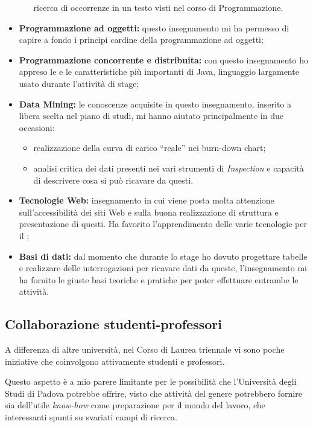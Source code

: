 \begin{itemize}
\begin{itemize}
    ricerca di occorrenze in un testo visti nel corso di Programmazione.
  \end{itemize}
\item \textbf{Programmazione ad oggetti:} questo insegnamento mi ha permesso
  di capire a fondo i principi cardine della programmazione ad oggetti;
\item \textbf{Programmazione concorrente e distribuita:} con questo
  insegnamento ho appreso le  e le caratteristiche più
  importanti di Java, linguaggio largamente usato durante l'attività di stage;
\item \textbf{Data Mining:} le conoscenze acquisite in questo insegnamento,
  inserito a libera scelta nel piano di studi, mi hanno aiutato principalmente
  in due occasioni:
  \begin{itemize}
  \item realizzazione della curva di carico ``reale'' nei burn-down chart;
  \item analisi critica dei dati presenti nei vari strumenti di
    \emph{Inspection} e capacità di descrivere cosa si può ricavare da questi.
  \end{itemize}
\item \textbf{Tecnologie Web:} insegnamento in cui viene posta molta attenzione
  sull'accessibilità dei siti Web e sulla buona realizzazione di struttura e
  presentazione di questi. Ha favorito l'apprendimento delle varie tecnologie
  per il \FREND;
\item \textbf{Basi di dati:} dal momento che durante lo stage ho dovuto
  progettare tabelle e realizzare delle interrogazioni per ricavare dati da
  queste, l'insegnamento mi ha fornito le giuste basi teoriche e pratiche per
  poter effettuare entrambe le attività.
\end{itemize}

\subsection{Collaborazione studenti-professori}

A differenza di altre università, nel Corso di Laurea triennale vi sono poche
iniziative che coinvolgono attivamente studenti e professori.

Questo aspetto è a mio parere limitante per le possibilità che l'Università
degli Studi di Padova potrebbe offrire, visto che attività del genere
potrebbero fornire sia dell'utile \emph{know-how} come preparazione per il
mondo del lavoro, che interessanti spunti su svariati campi di ricerca.

